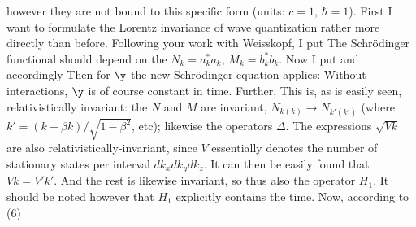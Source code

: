 however they are not bound to this specific form (units: $c=1$, $\hbar=1$). First I want to formulate the Lorentz invariance of wave quantization rather more directly than before. Following your work with Weisskopf, I put
The Schr\"odinger functional should depend on the $N_k = a_k^*a_k$, $M_k = b_k^* b_k$.
Now I put
and accordingly
Then for $\y$ the new Schr\"odinger equation applies:
Without interactions, $\y$ is of course constant in time. Further,
This is, as is easily seen, relativistically invariant: the $N$ and $M$ are invariant,  $N_{k(k)}\to N_{k'(k')}$ (where $k'=(k-\beta k)/\sqrt{1-\beta^2}$, etc); likewise the operators $\Delta$. The expressions $\sqrt{Vk}$ are also relativistically-invariant, since $V$ essentially denotes the number of stationary states per interval $dk_x dk_y dk_z$. It can then be easily found that $Vk=V'k'$. And the rest is likewise invariant, so thus also the operator $H_1$. It should be noted however that $H_1$ explicitly contains the time. Now, according to (6)

